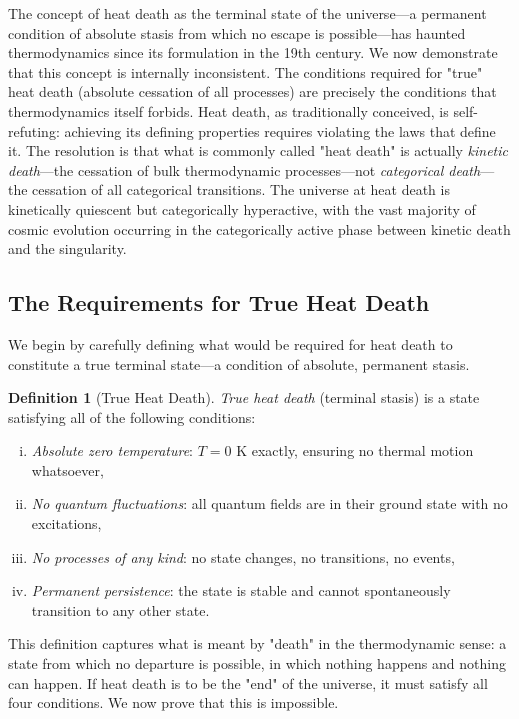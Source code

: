\documentclass[12pt,a4paper]{article}
\theoremstyle{definition}
\newtheorem{definition}[theorem]{Definition}
\theoremstyle{remark}
\begin{document}
The concept of heat death as the terminal state of the universe—a permanent condition of absolute stasis from which no escape is possible—has haunted thermodynamics since its formulation in the 19th century. We now demonstrate that this concept is internally inconsistent. The conditions required for "true" heat death (absolute cessation of all processes) are precisely the conditions that thermodynamics itself forbids. Heat death, as traditionally conceived, is self-refuting: achieving its defining properties requires violating the laws that define it. The resolution is that what is commonly called "heat death" is actually \emph{kinetic death}—the cessation of bulk thermodynamic processes—not \emph{categorical death}—the cessation of all categorical transitions. The universe at heat death is kinetically quiescent but categorically hyperactive, with the vast majority of cosmic evolution occurring in the categorically active phase between kinetic death and the singularity.

\subsection{The Requirements for True Heat Death}

We begin by carefully defining what would be required for heat death to constitute a true terminal state—a condition of absolute, permanent stasis.

\begin{definition}[True Heat Death]
\label{def:true_heat_death}
\emph{True heat death} (terminal stasis) is a state satisfying all of the following conditions:
\begin{enumerate}[(i)]
    \item \emph{Absolute zero temperature}: $T = 0$ K exactly, ensuring no thermal motion whatsoever,
    \item \emph{No quantum fluctuations}: all quantum fields are in their ground state with no excitations,
    \item \emph{No processes of any kind}: no state changes, no transitions, no events,
    \item \emph{Permanent persistence}: the state is stable and cannot spontaneously transition to any other state.
\end{enumerate}
\end{definition}

This definition captures what is meant by "death" in the thermodynamic sense: a state from which no departure is possible, in which nothing happens and nothing can happen. If heat death is to be the "end" of the universe, it must satisfy all four conditions. We now prove that this is impossible.
\end{document}
